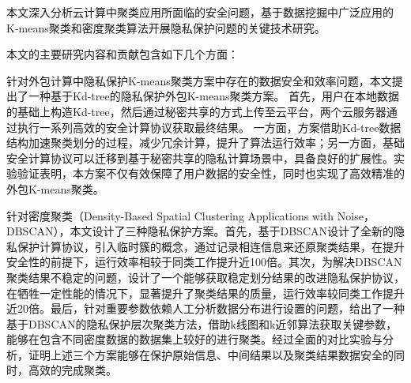 \begin{cabstract}
本文深入分析云计算中聚类应用所面临的安全问题，基于数据挖掘中广泛应用的K-means聚类和密度聚类算法开展隐私保护问题的关键技术研究。

本文的主要研究内容和贡献包含如下几个方面：
\begin{compactenum}
\item 针对外包计算中隐私保护K-means聚类方案中存在的数据安全和效率问题，本文提出了一种基于Kd-tree的隐私保护外包K-means聚类方案。
首先，用户在本地数据的基础上构造Kd-tree，然后通过秘密共享的方式上传至云平台，两个云服务器通过执行一系列高效的安全计算协议获取最终结果。
一方面，方案借助Kd-tree数据结构加速聚类划分的过程，减少冗余计算，提升了算法运行效率；另一方面，基础安全计算协议可以迁移到基于秘密共享的隐私计算场景中，具备良好的扩展性。实验验证表明，本方案不仅有效保障了用户数据的安全性，同时也实现了高效精准的外包K-means聚类。

\item 针对密度聚类（Density-Based Spatial Clustering Applications with Noise，DBSCAN），本文设计了三种隐私保护方案。首先，基于DBSCAN设计了全新的隐私保护计算协议，引入临时簇的概念，通过记录相连信息来还原聚类结果，在提升安全性的前提下，运行效率相较于同类工作提升近100倍。其次，为解决DBSCAN聚类结果不稳定的问题，设计了一个能够获取稳定划分结果的改进隐私保护协议，在牺牲一定性能的情况下，显著提升了聚类结果的质量，运行效率较同类工作提升近20倍。最后，针对重要参数依赖人工分析数据分布进行设置的问题，给出了一种基于DBSCAN的隐私保护层次聚类方法，借助k线图和k近邻算法获取关键参数，能够在包含不同密度数据的数据集上较好的进行聚类。经过全面的对比实验与分析，证明上述三个方案能够在保护原始信息、中间结果以及聚类结果数据安全的同时，高效的完成聚类。   
\end{compactenum}                                               
\end{cabstract}

